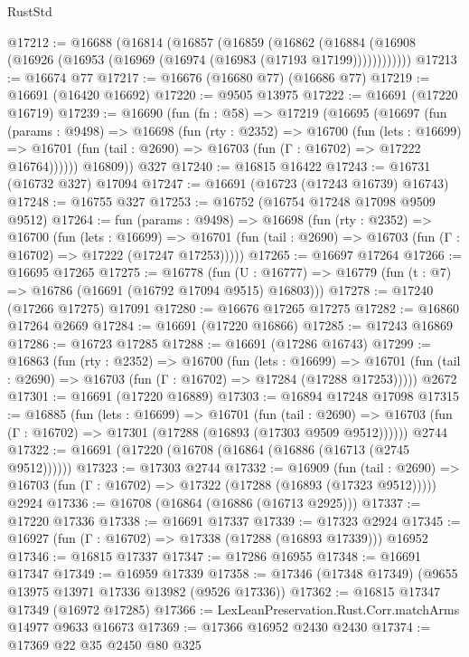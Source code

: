\begin{lexlean}{RustStd}
\begin{coremodule}
@17212 := @16688
    (@16814
      (@16857
        (@16859
          (@16862 (@16884 (@16908 (@16926 (@16953 (@16969 (@16974 (@16983 (@17193 @17199))))))))))))
@17213 := @16674 @77
@17217 := @16676 (@16680 @77) (@16686 @77)
@17219 := @16691 (@16420 @16692)
@17220 := @9505 @13975
@17222 := @16691 (@17220 @16719)
@17239 := @16690
    (fun (fn : @58) =>
    @17219
      (@16695
        (@16697
          (fun (params : @9498) =>
          @16698
            (fun (rty : @2352) =>
            @16700
              (fun (lets : @16699) =>
              @16701 (fun (tail : @2690) => @16703 (fun (Γ : @16702) => @17222 @16764))))))
        @16809))
    @327
@17240 := @16815 @16422
@17243 := @16731 (@16732 @327) @17094
@17247 := @16691 (@16723 (@17243 @16739) @16743)
@17248 := @16755 @327
@17253 := @16752 (@16754 @17248 @17098 @9509 @9512)
@17264 := fun (params : @9498) =>
  @16698
    (fun (rty : @2352) =>
    @16700
      (fun (lets : @16699) =>
      @16701 (fun (tail : @2690) => @16703 (fun (Γ : @16702) => @17222 (@17247 @17253)))))
@17265 := @16697 @17264
@17266 := @16695 @17265
@17275 := @16778
    (fun (U : @16777) => @16779 (fun (t : @7) => @16786 (@16691 (@16792 @17094 @9515) @16803)))
@17278 := @17240 (@17266 @17275) @17091
@17280 := @16676 @17265 @17275
@17282 := @16860 @17264 @2669
@17284 := @16691 (@17220 @16866)
@17285 := @17243 @16869
@17286 := @16723 @17285
@17288 := @16691 (@17286 @16743)
@17299 := @16863
    (fun (rty : @2352) =>
    @16700
      (fun (lets : @16699) =>
      @16701 (fun (tail : @2690) => @16703 (fun (Γ : @16702) => @17284 (@17288 @17253)))))
    @2672
@17301 := @16691 (@17220 @16889)
@17303 := @16894 @17248 @17098
@17315 := @16885
    (fun (lets : @16699) =>
    @16701
      (fun (tail : @2690) =>
      @16703 (fun (Γ : @16702) => @17301 (@17288 (@16893 (@17303 @9509 @9512))))))
    @2744
@17322 := @16691 (@17220 (@16708 (@16864 (@16886 (@16713 (@2745 @9512))))))
@17323 := @17303 @2744
@17332 := @16909
    (fun (tail : @2690) => @16703 (fun (Γ : @16702) => @17322 (@17288 (@16893 (@17323 @9512)))))
    @2924
@17336 := @16708 (@16864 (@16886 (@16713 @2925)))
@17337 := @17220 @17336
@17338 := @16691 @17337
@17339 := @17323 @2924
@17345 := @16927 (fun (Γ : @16702) => @17338 (@17288 (@16893 @17339))) @16952
@17346 := @16815 @17337
@17347 := @17286 @16955
@17348 := @16691 @17347
@17349 := @16959 @17339
@17358 := @17346 (@17348 @17349) (@9655 @13975 @13971 @17336 @13982 (@9526 @17336))
@17362 := @16815 @17347 @17349 (@16972 @17285)
@17366 := LexLeanPreservation.Rust.Corr.matchArms @14977 @9633 @16673
@17369 := @17366 @16952 @2430 @2430
@17374 := @17369 @22 @35 @2450 @80 @325

\end{coremodule}
\end{lexlean}
